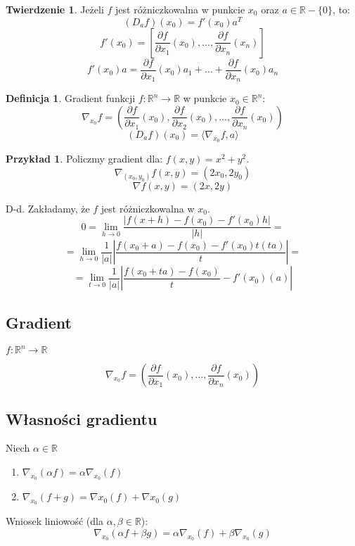 \documentclass{article}
\theoremstyle{definition}
\newtheorem{de}{Definicja}[subsection]
\theoremstyle{definition}
\newtheorem{tw}{Twierdzenie}[subsection]
\theoremstyle{definition}
\newtheorem{pk}{Przykład}[subsection]
\theoremstyle{definition}
\begin{document}
\begin{tw}
    Jeżeli $f$ jest różniczkowalna w punkcie $x_0$ oraz $a\in\mathbb{R}-\{0\}$, to:
    \[(D_a f)(x_0) = f'(x_0) a^{T}\]
    \[f'(x_0)=\left[\frac{\partial f}{\partial x_1} (x_0),\dots,\frac{\partial f}{\partial x_n} (x_n)\right]\]
    \[f'(x_0)a = \frac{\partial f}{\partial x_1}(x_0)a_1 + \dots + \frac{\partial f}{\partial x_n} (x_0) a_n\]
\end{tw}

\begin{de}
    Gradient funkcji $f: \mathbb{R}^n\rightarrow\mathbb{R}$ w punkcie $x_0\in\mathbb{R}^n$:
    \[\nabla_{x_0} f = \left(\frac{\partial f}{\partial x_1} (x_0), \frac{\partial f}{\partial x_2} (x_0),\dots, \frac{\partial f}{\partial x_n} (x_0)\right)\]
    \[(D_a f) (x_0) = \langle \nabla_{x_0} f, a \rangle\]
\end{de}

\begin{pk}
    Policzmy gradient dla: $f(x,y)=x^2+y^2$.
    \[\nabla_(x_0,y_0) f(x,y) = (2x_0, 2y_0)\]
    \[\nabla f(x,y) = (2x,2y)\]
\end{pk}
D-d. Zakładamy, że $f$ jest różniczkowalna w $x_0$. 
\[0=\lim_{h\rightarrow 0} \frac{|f(x+h)-f(x_0)-f'(x_0)h|}{|h|}=\]
\[=\lim_{h\rightarrow 0} \frac{1}{|a|} \left|\frac{f(x_0+a)-f(x_0)-f'(x_0)t(ta)}{t}\right|=\]
\[=\lim_{t\rightarrow 0} \frac{1}{|a|} \left|\frac{f(x_0+ta)-f(x_0)}{t}-f'(x_0)(a)\right|\]

\subsection{Gradient}

$f:\mathbb{R}^n \rightarrow \mathbb{R}$

\[\nabla_{x_0} f = \left(\frac{\partial f}{\partial x_1} (x_0), \dots, \frac{\partial f}{\partial x_n} (x_0)\right)\]

\subsection{Własności gradientu}

Niech $\alpha \in \mathbb{R}$
\begin{enumerate}
    \item $\nabla_{x_0} (\alpha f) = \alpha \nabla_{x_0} (f)$
    \item $\nabla_{x_0} (f+g) = \nabla{x_0} (f) + \nabla{x_0} (g)$
\end{enumerate}
Wniosek liniowość (dla $\alpha,\beta \in \mathbb{R}$):
\[\nabla_{x_0} (\alpha f + \beta g) = \alpha \nabla_{x_0} (f) + \beta \nabla_{x_0} (g)\]
\end{document}
